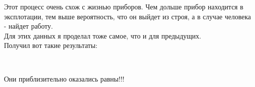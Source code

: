 \documentclass[a4paper,12pt, oneside]{book}
\begin{document}
Этот процесс очень схож с жизнью приборов. Чем дольше прибор находится в эксплотации, тем выше вероятность, что он выйдет из строя, а в случае человека - найдет работу.\\ 

Для этих данных я проделал тоже самое, что и для предыдущих. \\

Получил вот такие результаты: 


\begin{figure}[h!]
	\begin{center}
		\begin{minipage}[h]{0.47\linewidth}
			  \\
			\vspace{15mm}
		\end{minipage}
	\end{center}
\end{figure}

Они приблизительно оказались равны!!!

\begin{figure}[h!]
	\begin{center}
		\begin{minipage}[h]{0.47\linewidth}
			\\
			\vspace{15mm}
		\end{minipage}
		\hfill	
		\begin{minipage}[h]{0.47\linewidth}
			 \\
		\end{minipage}
	\end{center}
\end{figure}
\end{document}
